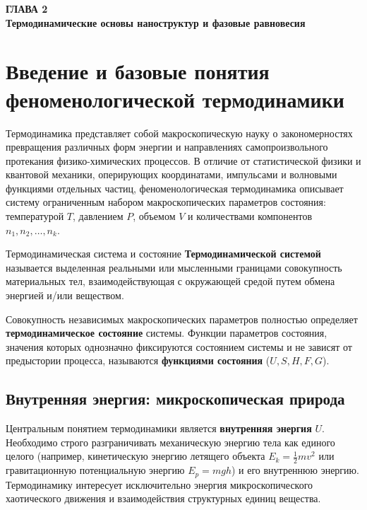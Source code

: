 \documentclass[12pt,a4paper]{article}
\begin{document}
\begin{center}
{\Large\bfseries\sffamily\color{guapblue} ГЛАВА 2}\\[0.3em]
{\LARGE\bfseries\sffamily\color{guapblue} Термодинамические основы наноструктур и фазовые равновесия}
\end{center}
\vspace{1em}

\section{Введение и базовые понятия феноменологической термодинамики}
\label{sec:intro}

Термодинамика представляет собой макроскопическую науку о закономерностях превращения различных форм энергии и направлениях самопроизвольного протекания физико-химических процессов. В отличие от статистической физики и квантовой механики, оперирующих координатами, импульсами и волновыми функциями отдельных частиц, феноменологическая термодинамика описывает систему ограниченным набором макроскопических параметров состояния: температурой $T$, давлением $P$, объемом $V$ и количествами компонентов $n_1, n_2, \dots, n_k$.

\begin{defbox}{Термодинамическая система и состояние}
\textbf{Термодинамической системой} называется выделенная реальными или мысленными границами совокупность материальных тел, взаимодействующая с окружающей средой путем обмена энергией и/или веществом.

Совокупность независимых макроскопических параметров полностью определяет \textbf{термодинамическое состояние} системы. Функции параметров состояния, значения которых однозначно фиксируются состоянием системы и не зависят от предыстории процесса, называются \textbf{функциями состояния} ($U, S, H, F, G$).
\end{defbox}

\subsection{Внутренняя энергия: микроскопическая природа}
Центральным понятием термодинамики является \textbf{внутренняя энергия} $U$. Необходимо строго разграничивать механическую энергию тела как единого целого (например, кинетическую энергию летящего объекта $E_k = \frac{1}{2}m v^2$ или гравитационную потенциальную энергию $E_p = mgh$) и его внутреннюю энергию. Термодинамику интересует исключительно энергия микроскопического хаотического движения и взаимодействия структурных единиц вещества.
\end{document}
